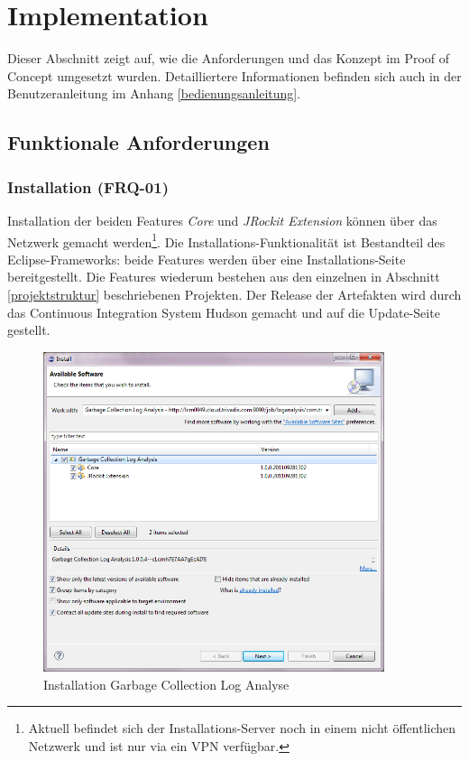 \chapter{Implementation}\label{implementation}
Dieser Abschnitt zeigt auf, wie die Anforderungen und das Konzept im Proof of Concept umgesetzt wurden. Detailliertere Informationen befinden sich auch in der Benutzeranleitung im Anhang \ref{bedienungsanleitung}.
\section{Funktionale Anforderungen}
\subsection{Installation (FRQ-01)}
Installation der beiden Features \textit{Core} und \textit{JRockit Extension} können über das Netzwerk gemacht werden\footnote{Aktuell befindet sich der Installations-Server noch in einem nicht öffentlichen Netzwerk und ist nur via ein VPN verfügbar.}. Die Installations-Funktionalität ist Bestandteil des Eclipse-Frameworks: beide Features werden über eine Installations-Seite bereitgestellt. Die Features wiederum bestehen aus den einzelnen in Abschnitt \ref{projektstruktur} beschriebenen Projekten. Der Release der Artefakten wird durch das Continuous Integration System Hudson gemacht und auf die Update-Seite gestellt.
 \begin{figure}[H]
  	\centering
    	\includegraphics[width=10cm]{images/tutorial_install01}
        	\caption{Installation Garbage Collection Log Analyse}
\end{figure}

